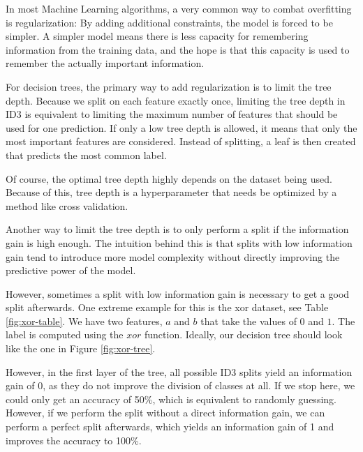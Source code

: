 \documentclass[a4paper]{article}
\begin{document}
In most Machine Learning algorithms, a very common way to combat overfitting is regularization: By adding additional constraints, the model is forced to be simpler. A simpler model means there is less capacity for remembering information from the training data, and the hope is that this capacity is used to remember the actually important information.

For decision trees, the primary way to add regularization is to limit the tree depth. Because we split on each feature exactly once, limiting the tree depth in ID3 is equivalent to limiting the maximum number of features that should be used for one prediction. If only a low tree depth is allowed, it means that only the most important features are considered. Instead of splitting, a leaf is then created that predicts the most common label.

Of course, the optimal tree depth highly depends on the dataset being used. Because of this, tree depth is a hyperparameter that needs be optimized by a method like cross validation.

Another way to limit the tree depth is to only perform a split if the information gain is high enough. The intuition behind this is that splits with low information gain tend to introduce more model complexity without directly improving the predictive power of the model.

However, sometimes a split with low information gain is necessary to get a good split afterwards. One extreme example for this is the xor dataset, see Table \ref{fig:xor-table}. We have two features, $a$ and $b$ that take the values of $0$ and $1$. The label is computed using the $\mathit{xor}$ function. Ideally, our decision tree should look like the one in Figure \ref{fig:xor-tree}.

However, in the first layer of the tree, all possible ID3 splits yield an information gain of $0$, as they do not improve the division of classes at all. If we stop here, we could only get an accuracy of 50\%, which is equivalent to randomly guessing. However, if we perform the split without a direct information gain, we can perform a perfect split afterwards, which yields an information gain of 1 and improves the accuracy to 100\%.

\begin{figure}
\begin{floatrow}
\end{floatrow}
\end{figure}
\end{document}
